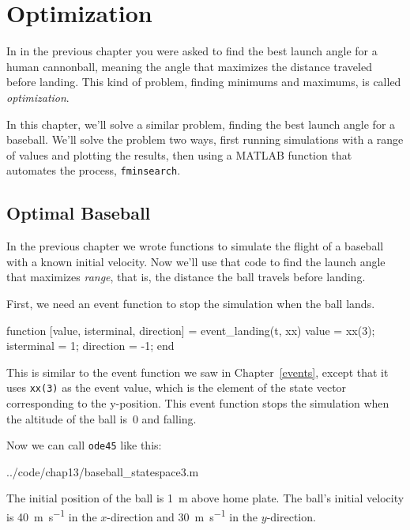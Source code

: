 \chapter{Optimization}


In  in the previous chapter you were asked to find the best launch angle for a human cannonball, meaning the angle that maximizes the distance traveled before landing.  This kind of problem, finding minimums and maximums, is called \emph{optimization}.

In this chapter, we'll solve a similar problem, finding the best launch angle for a baseball.
We'll solve the problem two ways, first running simulations with a range of values and plotting the results, then using a MATLAB function that automates the process, \lstinline{fminsearch}.

\section{Optimal Baseball}

In the previous chapter we wrote functions to simulate the flight of a baseball with a known initial velocity.  Now we'll use that code to find the launch angle that maximizes \emph{range}, that is, the distance the ball travels before landing.


First, we need an event function to stop the simulation when the ball lands.
\begin{code}
function [value, isterminal, direction] = event_landing(t, xx)
    value = xx(3);
    isterminal = 1;
    direction = -1;
end
\end{code}


This is similar to the event function we saw in Chapter~\ref{events}, except that it uses \lstinline{xx(3)} as the event value, which is the element of the state vector corresponding to the y-position.  This event function stops the simulation when the altitude of the ball is~0 and falling.

Now we can call \lstinline{ode45} like this:

{../code/chap13/baseball_statespace3.m}


The initial position of the ball is \SI{1}{\meter} above home plate.  The ball's initial velocity is \SI{40}{\meter\per\second} in the $x$-direction and \SI{30}{\meter\per\second} in the $y$-direction.

